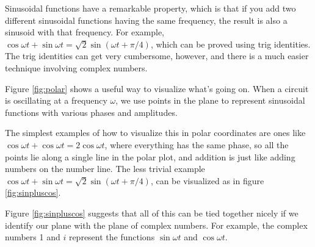 Sinusoidal functions have a remarkable property, which is that if you
add two different sinusoidal functions having the same frequency, the result
is also a sinusoid with that frequency.
For example, $\cos\omega t+\sin\omega t=\sqrt{2}\sin(\omega t+\pi/4)$, which can be proved
using trig identities. The trig identities can get very cumbersome, however, and there is
a much easier technique involving complex numbers.

Figure \ref{fig:polar} shows a useful way to visualize what's going on.
When a circuit is oscillating at a frequency $\omega$, we use points in
the plane to represent sinusoidal functions with various phases and
amplitudes.



The simplest examples of how to
visualize this in polar coordinates are ones like $\cos \omega t+\cos \omega t=2\cos \omega t$,
where everything has the same phase, so all the points
lie along a single line in the polar plot, and addition is just like adding numbers
on the number line.
The less trivial example $\cos\omega t+\sin\omega t=\sqrt{2}\sin(\omega t+\pi/4)$,
can be visualized as in figure \ref{fig:sinpluscos}.

Figure  \ref{fig:sinpluscos} suggests that
all of this can be tied together nicely if we identify our plane with the plane
of complex numbers. For example, the complex numbers 1 and $i$ represent the
functions $\sin\omega t$ and $\cos\omega t$.
